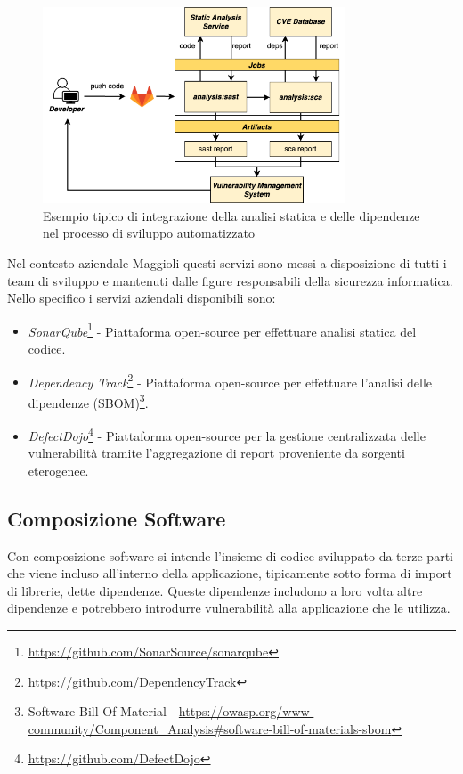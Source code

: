 \begin{figure}[H]
\centering
\includegraphics[width=0.8\textwidth]{img/tesi-12-sastsca.drawio.png}
\caption{Esempio tipico di integrazione della analisi statica e delle dipendenze nel processo di sviluppo automatizzato}
\end{figure}

Nel contesto aziendale Maggioli questi servizi sono messi a disposizione di tutti i team di sviluppo e mantenuti dalle figure responsabili della sicurezza informatica. Nello specifico i servizi aziendali disponibili sono:
\begin{itemize}
    \item \textit{SonarQube}\footnote{\url{https://github.com/SonarSource/sonarqube}} - Piattaforma open-source per effettuare analisi statica del codice.
    \item \textit{Dependency Track}\footnote{\url{https://github.com/DependencyTrack}} - Piattaforma open-source per effettuare l'analisi delle dipendenze (SBOM)\footnote{Software Bill Of Material - \url{https://owasp.org/www-community/Component_Analysis\#software-bill-of-materials-sbom}}.
    \item \textit{DefectDojo}\footnote{\url{https://github.com/DefectDojo}} - Piattaforma open-source per la gestione centralizzata delle vulnerabilità tramite l'aggregazione di report proveniente da sorgenti eterogenee.
\end{itemize}

\subsection{Composizione Software}
Con composizione software si intende l'insieme di codice sviluppato da terze parti che viene incluso all'interno della applicazione, tipicamente sotto forma di import di librerie, dette dipendenze. Queste dipendenze includono a loro volta altre dipendenze e potrebbero introdurre vulnerabilità alla applicazione che le utilizza.

